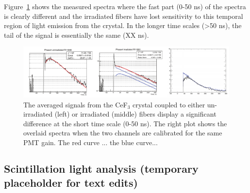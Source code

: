 \documentclass[a4paper,11pt]{article}
\begin{document}
Figure~\ref{fig:CeF3signals} shows the measured spectra where the fast part (0-50 ns) of the spectra is clearly different and the irradiated fibers have lost sensitivity to this temporal region of light emission from the crystal.  In the longer time scales (>50 ns), the tail of the signal is essentially the same (XX ns).

\begin{figure}[ht]
\begin{center}
      \includegraphics[width=14cm]{Figures/CeF3coupledFibers.pdf}
\caption{\small The averaged signals from the CeF$_3$ crystal coupled to either un-irradiated (left) or irradiated (middle) fibers display a significant difference at the short time scale (0-50 ns).  The right plot shows the overlaid spectra when the two channels are calibrated for the same PMT gain.  The red curve ...  the blue curve...}
    \label{fig:CeF3signals}
\end{center}
\end{figure}


\subsection{Scintillation light analysis (temporary placeholder for text edits)}
\end{document}
